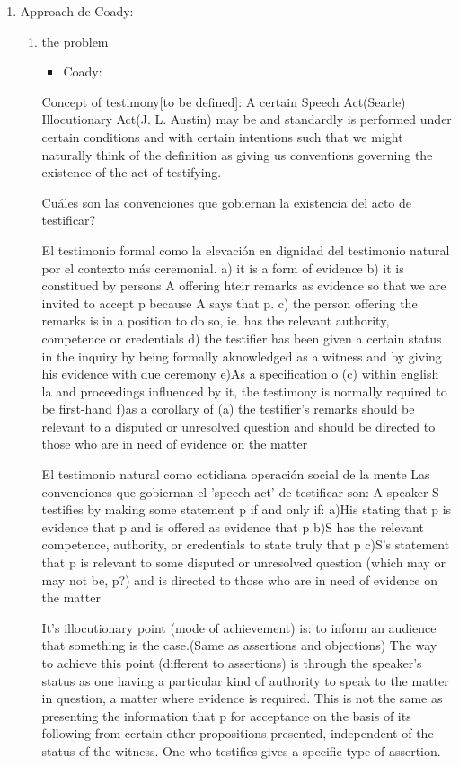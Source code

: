 \documentclass[11pt]{article}
\begin{document}
\begin{enumerate}
\item Approach de Coady:
\label{sec-4-1-2-1}
\begin{enumerate}
\item the problem
\label{sec-4-1-2-1-1}
\begin{itemize}
\item Coady:
\end{itemize}
Concept of testimony[to be defined]:
A certain Speech Act(Searle)
Illocutionary Act(J. L. Austin)
may be and standardly is 
performed 
under certain conditions
and
with certain intentions
such that we might naturally think of 
the definition 
as giving us
conventions governing
the existence of the act of testifying.

Cuáles son las convenciones que gobiernan la existencia del acto de testificar?

El testimonio formal como la elevación en dignidad del testimonio natural por el contexto más ceremonial.
a) it is a form of evidence
b) it is constitued by persons A offering hteir remarks as evidence so that we are invited to accept p because A says that p.
c) the person offering the remarks is in a position to do so, ie. has the relevant authority, competence or credentials
d) the testifier has been given a certain status in the inquiry by being formally aknowledged as a witness and by giving his evidence with due ceremony
e)As a specification o (c) within english la and proceedings influenced by it, the testimony is normally required to be first-hand
f)as a corollary of (a) the testifier's remarks should be relevant to a disputed or unresolved question and should be directed to those who are in need of evidence on the matter

El testimonio natural como cotidiana operación social de la mente
Las convenciones que gobiernan el 'speech act' de testificar son:
A speaker S testifies by making some statement p if and only if:
a)His stating that p is evidence that p and is offered as evidence that p 
b)S has the relevant competence, authority, or credentials to state truly that p
c)S's statement that p is relevant to some disputed or unresolved question (which may or may not be, p?) and is directed to those who are in need of evidence on the matter

It's illocutionary point (mode of achievement) is: to inform an audience that something is the case.(Same as assertions and objections)
The way to achieve this point (different to assertions) is through the speaker's status as one having a particular kind of authority to speak to the matter in question, a matter where evidence is required. 
This is not the same as presenting the information that p for acceptance on the basis of its following from certain other propositions presented, independent of the status of the witness. 
One who testifies gives a specific type of assertion.


\end{enumerate}
\end{enumerate}
\end{document}
